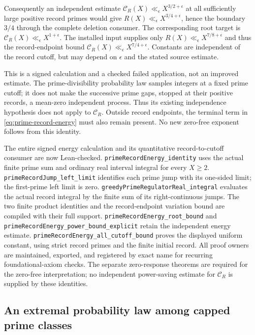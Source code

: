 \documentclass[11pt]{article}
\theoremstyle{definition}
\begin{document}
Consequently an independent estimate
$\mathcal C_R(X)\ll_\epsilon X^{3/2+\epsilon}$ at all sufficiently
large positive record primes would give
$R(X)\ll_\epsilon X^{3/4+\epsilon}$, hence the boundary $3/4$
through the complete deletion consumer.
The corresponding root target is
$\mathcal C_R(X)\ll_\epsilon X^{1+\epsilon}$.
The installed input supplies only
$R(X)\ll_\epsilon X^{7/8+\epsilon}$ and thus the record-endpoint
bound $\mathcal C_R(X)\ll_\epsilon X^{7/4+\epsilon}$.
Constants are independent of the record cutoff, but may depend
on $\epsilon$ and the stated source estimate.

This is a signed calculation and a checked failed application,
not an improved estimate. The prime-divisibility probability
law samples integers at a fixed prime cutoff; it does not make
the successive prime gaps, stopped at their positive records,
a mean-zero independent process. Thus its existing independence
hypothesis does not apply to $\mathcal C_R$.
Outside record endpoints, the terminal term in
\eqref{eq:prime-record-energy} must also remain present.
No new zero-free exponent follows from this identity.

The entire signed energy calculation and its quantitative record-to-cutoff
consumer are now Lean-checked.
\texttt{primeRecordEnergy\_\allowbreak identity} uses the actual finite
prime sum and ordinary real interval integral for every \(X\ge2\).
\texttt{primeRecordJump\_\allowbreak left\_\allowbreak limit} identifies
each prime jump with its one-sided limit; the first-prime left limit is
zero.
\texttt{greedyPrimeRegulatorReal\_\allowbreak integral} evaluates the
actual record integral by the finite sum of its right-continuous jumps.
The two finite product identities and the record-endpoint variation
bound are compiled with their full support.
\texttt{primeRecordEnergy\_\allowbreak root\_\allowbreak bound} and
\texttt{primeRecordEnergy\_\allowbreak power\_\allowbreak bound\_\allowbreak explicit}
retain the independent energy estimate.
\texttt{primeRecordEnergy\_\allowbreak all\_\allowbreak cutoff\_\allowbreak bound}
proves the displayed uniform constant, using strict record primes
and the finite initial record.
All proof owners are maintained, exported, and registered by exact name
for recurring foundational-axiom checks.
The separate zero-response theorems are required for the zero-free
interpretation; no independent power-saving estimate for
\(\mathcal C_R\) is supplied by these identities.

\subsection{An extremal probability law among capped prime classes}
\label{sec:capped-prime-probability-extremum}
\end{document}
